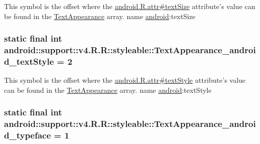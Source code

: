 This symbol is the offset where the \hyperlink{}{android.R.attr\#textSize} attribute's value can be found in the \hyperlink{classandroid_1_1support_1_1v4_1_1_r_1_1styleable_958f0ff7225bca693e30641e14dd4569}{TextAppearance} array.  name \hyperlink{namespaceandroid}{android}:textSize \hypertarget{classandroid_1_1support_1_1v4_1_1_r_1_1styleable_0613c7992a55173fc1d4760327545d8a}{
\subsubsection[{TextAppearance\_\-android\_\-textStyle}]{\setlength{\rightskip}{0pt plus 5cm}static final int android::support::v4.R.R::styleable::TextAppearance\_\-android\_\-textStyle = 2}}
\label{classandroid_1_1support_1_1v4_1_1_r_1_1styleable_0613c7992a55173fc1d4760327545d8a}


This symbol is the offset where the \hyperlink{}{android.R.attr\#textStyle} attribute's value can be found in the \hyperlink{classandroid_1_1support_1_1v4_1_1_r_1_1styleable_958f0ff7225bca693e30641e14dd4569}{TextAppearance} array.  name \hyperlink{namespaceandroid}{android}:textStyle \hypertarget{classandroid_1_1support_1_1v4_1_1_r_1_1styleable_6c3c73a9cbb806db9a963cfd57cf2040}{
\subsubsection[{TextAppearance\_\-android\_\-typeface}]{\setlength{\rightskip}{0pt plus 5cm}static final int android::support::v4.R.R::styleable::TextAppearance\_\-android\_\-typeface = 1}}
\label{classandroid_1_1support_1_1v4_1_1_r_1_1styleable_6c3c73a9cbb806db9a963cfd57cf2040}


